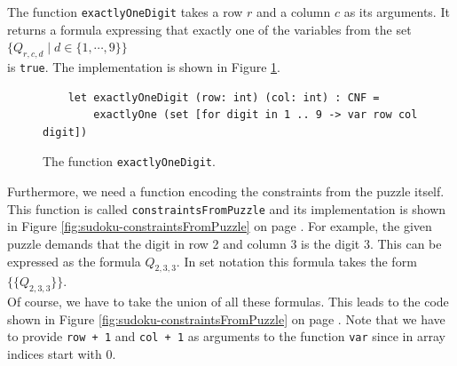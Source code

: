 The function \texttt{exactlyOneDigit} takes a row $r$ and a column $c$ as its arguments.  It returns a
formula expressing that exactly one of the variables from the set
\\[0.2cm]
\hspace*{1.3cm}
$\bigl\{ Q_{r,c,d} \mid d \in \{1,\cdots, 9\} \bigr\}$
\\[0.2cm]
is \texttt{true}. The implementation is shown in Figure \ref{fig:sudoku-exactlyOneDigit}.

\begin{figure}[!ht]
\centering
\begin{verbatim}
    let exactlyOneDigit (row: int) (col: int) : CNF =
        exactlyOne (set [for digit in 1 .. 9 -> var row col digit])
\end{verbatim}
\vspace*{-0.3cm}
\caption{The function \texttt{exactlyOneDigit}.}
\label{fig:sudoku-exactlyOneDigit}
\end{figure}


Furthermore, we need a function encoding the constraints from the puzzle itself.
This function is called \texttt{constraintsFromPuzzle} and its implementation is shown in Figure
\ref{fig:sudoku-constraintsFromPuzzle} on page \pageref{fig:sudoku-constraintsFromPuzzle}.
For example, the given puzzle demands that the digit in row 2 and column 3 is the digit $3$.
This can be expressed as the formula $Q_{2,3,3}$.  In set notation this formula takes the form
\\[0.2cm]
\hspace*{1.3cm}
$\bigl\{ \{Q_{2,3,3}\} \bigr\}$.
\\[0.2cm]
Of course, we have to take the union of all these formulas.  This leads to the code shown in Figure
\ref{fig:sudoku-constraintsFromPuzzle} on page \pageref{fig:sudoku-constraintsFromPuzzle}.
Note that we have to provide \texttt{row + 1} and \texttt{col + 1} as arguments to the function \texttt{var} since
in \Fsharp{} array indices start with $0$.

